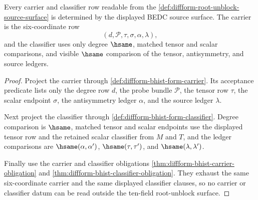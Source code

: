 \begin{theorem}
\label{thm:diffform-root-unblock-carrier-classifier-scope}
Every carrier and classifier row readable from the
\autoref{def:diffform-root-unblock-source-surface} is determined by the
displayed BEDC source surface. The carrier is the six-coordinate row
$$
(d,\mathcal{P},\tau,\sigma,\alpha,\lambda),
$$
and the classifier uses only degree $\hsame$, matched tensor and scalar
comparisons, and visible $\hsame$ comparison of the tensor, antisymmetry, and
source ledgers.
\end{theorem}
\begin{proof}
Project the carrier through \autoref{def:diffform-bhist-form-carrier}. Its
acceptance predicate lists only the degree row $d$, the probe bundle
$\mathcal{P}$, the tensor row $\tau$, the scalar endpoint $\sigma$, the
antisymmetry ledger $\alpha$, and the source ledger $\lambda$.

Next project the classifier through
\autoref{def:diffform-bhist-form-classifier}. Degree comparison is $\hsame$,
matched tensor and scalar endpoints use the displayed tensor row and the
retained scalar classifier from $M$ and $T$, and the ledger comparisons are
$\hsame(\alpha,\alpha')$, $\hsame(\tau,\tau')$, and
$\hsame(\lambda,\lambda')$.

Finally use the carrier and classifier obligations
\autoref{thm:diffform-bhist-carrier-obligation} and
\autoref{thm:diffform-bhist-classifier-obligation}. They exhaust the same
six-coordinate carrier and the same displayed classifier clauses, so no
carrier or classifier datum can be read outside the ten-field root-unblock
surface.
\end{proof}

